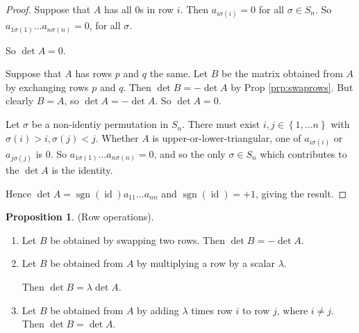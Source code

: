 \documentclass{article}
\theoremstyle{definition} \newtheorem*{definition}{Definition}
\newtheorem{proposition}[theorem]{Proposition}
\DeclareMathOperator{\sgn}{sgn} \DeclareMathOperator{\id}{id}
\begin{document}
  \begin{proof} Suppose that $A$ has all $0$s in row $i$. Then
    $a_{i\sigma(i)}=0$ for all $\sigma \in S_{n}$. So $a_{1\sigma(1)}\dots
    a_{n\sigma(n)}=0$, for all $\sigma$.

    So $\det A = 0$.

    Suppose that $A$ has rows $p$ and $q$ the same. Let $B$ be the matrix
    obtained from $A$ by exchanging rows $p$ and $q$. Then $\det B=-\det A$ by
    Prop \ref{prp:swaprows}.  But clearly $B=A$, so $\det A = - \det A$. So
    $\det A=0$.

    Let $\sigma$ be a non-identiy permutation in $S_n$. There must exist $i,j
    \in \left\{ 1,\dots n \right\}$ with $\sigma(i) > i, \sigma(j)<j$. Whether
    $A$ is upper-or-lower-triangular, one of $a_{i\sigma(i)}$ or
    $a_{j\sigma(j)}$ is 0. So $a_{1\sigma(1)}\dots a_{n\sigma(n)}=0$, and so
    the only $\sigma \in S_n$ which contributes to the $\det A$ is the
    identity.

    Hence $\det A = \sgn(\id)a_{11}\dots a_{nn}$ and $\sgn(\id)=+1$, giving the
    result. 

  \end{proof} \begin{proposition} (Row operations).  \begin{enumerate} \item
          Let $B$ be obtained by swapping two rows. Then $\det B=-\det A$.
        \item Let $B$ be obtained from $A$ by multiplying a row by a scalar
          $\lambda$.

          Then $\det B = \lambda \det A$.  \item Let $B$ be obtained from $A$
            by adding $\lambda$ times row $i$ to row $j$, where $i \neq j$.
            Then $\det B = \det A$.  \end{enumerate} \end{proposition}
\end{document}
